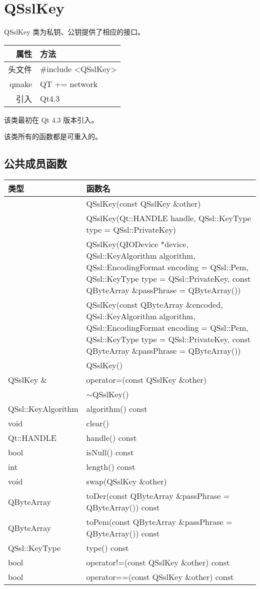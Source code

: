 \chapter{QSslKey}

QSslKey 类为私钥、公钥提供了相应的接口。

\begin{tabular}{|r|l|}
	\hline
	属性 & 方法 \\
	\hline
	头文件 & \#include <QSslKey>\\      
	\hline
	qmake & QT += network\\      
	\hline
	引入 &	Qt4.3 \\ 
	\hline
\end{tabular}

该类最初在 Qt 4.3 版本引入。

\begin{notice}
该类所有的函数都是可重入的。
\end{notice}

\section{公共成员函数}

\begin{longtable}[l]{|l|m{30em}|}
\hline 
类型 &	函数名\\ 
\hline 
&QSslKey(const QSslKey \&other) \\ 
	\hline
	&QSslKey(Qt::HANDLE handle, QSsl::KeyType type = QSsl::PrivateKey) \\ 
	\hline
	& QSslKey(QIODevice *device, QSsl::KeyAlgorithm algorithm, QSsl::EncodingFormat encoding = QSsl::Pem, QSsl::KeyType type = QSsl::PrivateKey, const QByteArray \&passPhrase = QByteArray()) \\ 
	\hline
	& QSslKey(const QByteArray \&encoded, QSsl::KeyAlgorithm algorithm, QSsl::EncodingFormat encoding = QSsl::Pem, QSsl::KeyType type = QSsl::PrivateKey, const QByteArray \&passPhrase = QByteArray()) \\
	\hline
	& QSslKey() \\ 
	\hline
QSslKey \& 	& operator=(const QSslKey \&other) \\ 
\hline
& $\sim$QSslKey() \\ 
	\hline
QSsl::KeyAlgorithm &	algorithm() const \\ 
\hline
void 	& clear() \\ 
\hline
Qt::HANDLE &	handle() const \\ 
\hline
bool &	isNull() const \\ 
\hline
int &	length() const \\ 
\hline
void &	swap(QSslKey \&other) \\ 
\hline
QByteArray &	toDer(const QByteArray \&passPhrase = QByteArray()) const \\ 
\hline
QByteArray& 	toPem(const QByteArray \&passPhrase = QByteArray()) const \\ 
\hline
QSsl::KeyType &	type() const \\ 
\hline
bool 	&operator!=(const QSslKey \&other) const \\ 
\hline
bool &	operator==(const QSslKey \&other) const \\
\hline 
\end{longtable}

